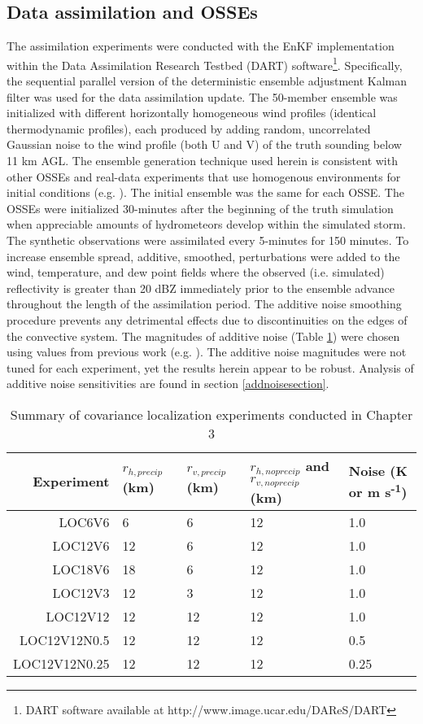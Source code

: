 \subsection{Data assimilation and OSSEs}
The assimilation experiments were conducted with the EnKF implementation within the Data Assimilation Research Testbed (DART) software\footnote{DART software available at http://www.image.ucar.edu/DAReS/DART}. Specifically, the sequential parallel version \citep{andersoncollins07} of the deterministic ensemble adjustment Kalman filter \citep{anderson01} was used for the data assimilation update. The 50-member ensemble was initialized with different horizontally homogeneous wind profiles (identical thermodynamic profiles), each produced by adding random, uncorrelated Gaussian noise to the wind profile (both U and V) of the truth sounding below 11 km AGL. The ensemble generation technique used herein is consistent with other OSSEs and real-data experiments that use homogenous environments for initial conditions (e.g. \citealt{dowelletal04}). The initial ensemble was the same for each OSSE. The OSSEs were initialized 30-minutes after the beginning of the truth simulation when appreciable amounts of hydrometeors develop within the simulated storm. The synthetic observations were assimilated every 5-minutes for 150 minutes. To increase ensemble spread, additive, smoothed, perturbations were added to the wind, temperature, and dew point fields where the observed (i.e. simulated) reflectivity is greater than 20 dBZ immediately prior to the ensemble advance \citep{dowellwicker09} throughout the length of the assimilation period. The additive noise smoothing procedure prevents any detrimental effects due to discontinuities on the edges of the convective system. The magnitudes of additive noise (Table \ref{exptable}) were chosen using values from previous work (e.g. \citealt{dowellwicker09}). The additive noise magnitudes were not tuned for each experiment, yet the results herein appear to be robust. Analysis of additive noise sensitivities are found in section \ref{addnoisesection}.

\begin{table}
\centering
\begin{tabular}{ r || m{2.5cm} | m{2.5cm} | m{2.5cm} | m{2.5cm} }
Experiment  & \(r_{h, precip}\) (km) & \(r_{v, precip}\) (km) & \(r_{h, noprecip}\) and \(r_{v, noprecip}\) (km) & Noise (K or m s\textsuperscript{-1}) \\
\hline \hline
LOC6V6 & 6 & 6 & 12 & 1.0 \\
LOC12V6 & 12 & 6 & 12 & 1.0 \\
LOC18V6 & 18 & 6 & 12 & 1.0 \\
LOC12V3 & 12 & 3 & 12 & 1.0 \\
LOC12V12 & 12 & 12 & 12 & 1.0 \\
LOC12V12N0.5 & 12 & 12 & 12 & 0.5 \\
LOC12V12N0.25 & 12 & 12 & 12 & 0.25 \\
\end{tabular}
\caption{Summary of covariance localization experiments conducted in Chapter 3}
\label{exptable}
\end{table}

